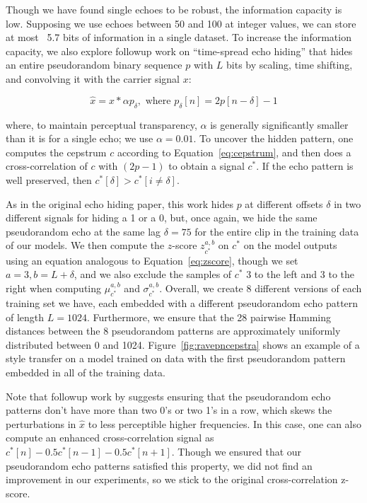 \documentclass[letterpaper]{article} %
\begin{document}
Though we have found single echoes to be robust, the information capacity is low.  Supposing we use echoes between 50 and 100 at integer values, we can store at most ~5.7 bits of information in a single dataset.  To increase the information capacity, we also explore followup work on ``time-spread echo hiding'' \cite{ko2005time} that hides an entire pseudorandom binary sequence $p$ with $L$ bits by scaling, time shifting, and convolving it with the carrier signal $x$:

\begin{equation}
\hat{x} = x * \alpha p_{\delta}, \text{ where } p_{\delta}[n] = 2 p[n - \delta] - 1
\end{equation}

where, to maintain perceptual transparency, $\alpha$ is generally significantly smaller than it is for a single echo; we use $\alpha = 0.01$.  To uncover the hidden pattern, one computes the cepstrum $c$ according to Equation~\ref{eq:cepstrum}, and then does a cross-correlation of $c$ with $(2p - 1)$ to obtain a signal $c^*$.  If the echo pattern is well preserved, then $c^*[\delta] > c^*[i \neq \delta]$.

As in the original echo hiding paper, this work hides $p$ at different offsets $\delta$ in two different signals for hiding a 1 or a 0, but, once again, we hide the same pseudorandom echo at the same lag $\delta=75$ for the entire clip in the training data of our models.  We then compute the $z$-score $z_{c^*}^{a,b}$ on $c^*$ on the model outputs using an equation analogous to Equation~\ref{eq:zscore}, though we set $a = 3, b=L+\delta$, and we also exclude the samples of $c^*$ 3 to the left and 3 to the right when computing $\mu_{c^*}^{a,b}$ and $\sigma_{c^*}^{a,b}$.  Overall, we create 8 different versions of each training set we have, each embedded with a different pseudorandom echo pattern of length $L=1024$.  Furthermore, we ensure that the 28 pairwise Hamming distances between the 8 pseudorandom patterns are approximately uniformly distributed between 0 and 1024.  Figure~\ref{fig:ravepncepstra} shows an example of a style transfer on a model trained on data with the first pseudorandom pattern embedded in all of the training data.


Note that followup work by \cite{xiang2010effective} suggests ensuring that the pseudorandom echo patterns don't have more than two 0's or two 1's in a row, which skews the perturbations in $\hat{x}$ to less perceptible higher frequencies.  In this case, one can also compute an enhanced cross-correlation signal as $c^*[n] - 0.5c^*[n-1] - 0.5c^*[n+1]$.  Though we ensured that our pseudorandom echo patterns satisfied this property, we did not find an improvement in our experiments, so we stick to the original cross-correlation z-score.
\end{document}
